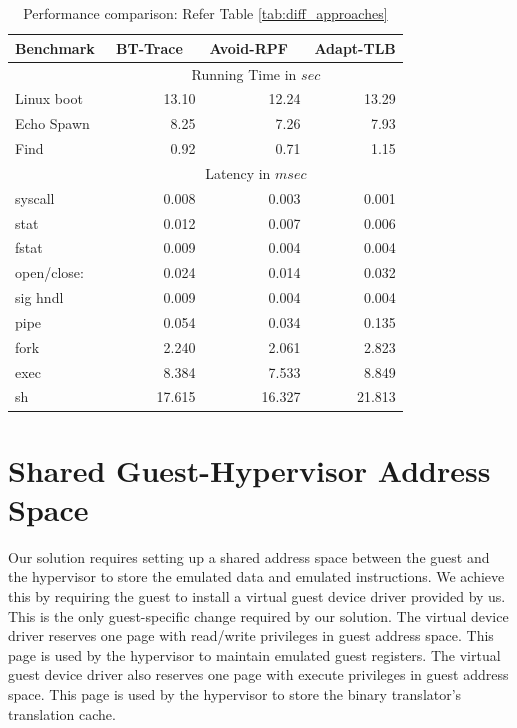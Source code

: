 \documentclass[10pt,twocolumn]{article}
\begin{document}
\begin{table}
\centering
\caption{Performance comparison: Refer Table \ref{tab:diff_approaches}}
      \begin{tabular}{|l|  r r r |} \hline
	         Benchmark\verb, ,& BT-Trace \verb, ,& Avoid-RPF \verb, , & Adapt-TLB  \\ \hline

     & \multicolumn{3}{c|}{ Running Time in $sec$}\\ \cline {2-4}  
     Linux boot	&	13.10	&	12.24	&	13.29		\\
Echo Spawn	&	8.25	&	7.26	&	7.93	\\
Find	&	0.92	&	0.71	&	1.15	\\ \cline{2-4}
	   
     & \multicolumn{3}{c|}{Latency in $msec$}\\  \cline{2-4}
syscall	&	0.008	&	0.003	&	0.001		\\
stat	&	0.012	&	0.007	&	0.006		\\
fstat	&	0.009	&	0.004	&	0.004		\\
open/close:	&	0.024	&	0.014	&		0.032	\\
sig hndl	&	0.009	&	0.004	&		0.004	\\
pipe 	&	0.054	&	0.034	&	0.135		\\
fork	&	2.240	&	2.061	&	2.823		\\
exec	&	8.384	&	7.533	&	8.849		\\
sh	&	17.615	&	16.327	&	21.813		\\        \hline
      \end{tabular}
\label{tab:detailed_results}
\end{table} 

\section{Shared Guest-Hypervisor Address Space}
\label{sec:sharedspace}
Our solution requires setting up a shared address space between the
guest and the hypervisor to store the emulated
data and emulated instructions.
We achieve this by requiring the guest to install a virtual guest
device driver provided by us. This is the
only guest-specific change required by our solution. The virtual
device driver reserves
one page with read/write privileges in guest address space. This page
is used by the hypervisor to maintain
emulated guest registers. The virtual guest device driver also
reserves one page with execute privileges in guest address space.
This page is used by the hypervisor to store the binary translator's
translation cache.
\end{document}
